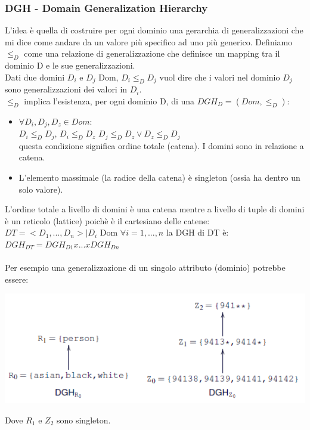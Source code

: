 \subsubsection{DGH - Domain Generalization Hierarchy}
L'idea è quella di costruire per ogni dominio una gerarchia di generalizzazioni che mi dice come andare da un valore più specifico ad uno più generico.
Definiamo \(\leq_D\) come una relazione di generalizzazione che definisce un mapping tra il dominio D e le sue generalizzazioni.\\
Dati due domini \(D_i\) e \(D_j\) \in Dom, \(D_i \leq_D D_j\) vuol dire che i valori nel dominio \(D_j\) sono generalizzazioni dei valori in \(D_i\). \\
\(\leq_D\) implica l'esistenza, per ogni dominio D, di una \(DGH_D = (Dom, \leq_D)\):
\begin{itemize}
    \item \(\forall D_i, D_j, D_z\in Dom:\) \\
    \(D_i \leq_D D_j\), \(D_i \leq_D D_z\) \Longrightarrow  \(D_j \leq_D D_z \lor D_z \leq_D D_j\)\\
    questa condizione significa ordine totale (catena). I domini sono in relazione a catena.
    \item L'elemento massimale (la radice della catena) è singleton (ossia ha dentro un solo valore).
\end{itemize}
L'ordine totale a livello di domini è una catena mentre a livello di tuple di domini è un reticolo (lattice) poichè è il cartesiano delle catene:\\
\( DT = <D_1,...,D_n> | D_i\) \in Dom \(\forall i=1,...,n \) la DGH di DT è: 
\(DGH_{DT} = DGH_{D1} x ... x DGH_{Dn}\)\\\\
\clearpage
Per esempio una generalizzazione di un singolo attributo (dominio) potrebbe essere:
\begin{center}
    \includegraphics[scale=0.7]{img/chaingener.png}
\end{center}
Dove \(R_1\) e \(Z_2\) sono singleton.\\
